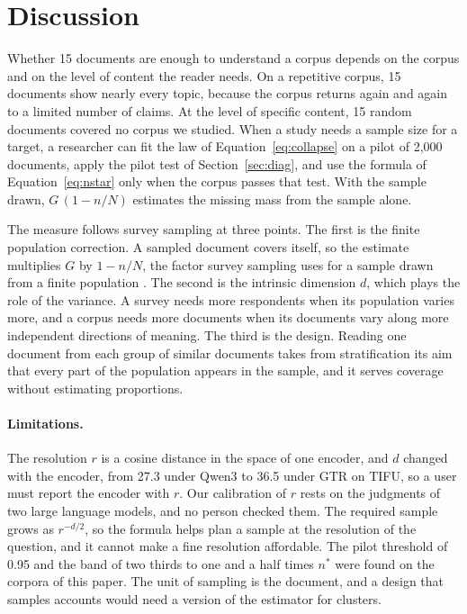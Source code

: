 \section{Discussion}

Whether 15 documents are enough to understand a corpus depends on the corpus and on the level of content the reader needs. On a repetitive corpus, 15 documents show nearly every topic, because the corpus returns again and again to a limited number of claims. At the level of specific content, 15 random documents covered no corpus we studied. When a study needs a sample size for a target, a researcher can fit the law of Equation~\ref{eq:collapse} on a pilot of 2{,}000 documents, apply the pilot test of Section~\ref{sec:diag}, and use the formula of Equation~\ref{eq:nstar} only when the corpus passes that test. With the sample drawn, $G\,(1 - n/N)$ estimates the missing mass from the sample alone.

The measure follows survey sampling at three points. The first is the finite population correction. A sampled document covers itself, so the estimate multiplies $G$ by $1 - n/N$, the factor survey sampling uses for a sample drawn from a finite population \citep{cochran1977}. The second is the intrinsic dimension $d$, which plays the role of the variance. A survey needs more respondents when its population varies more, and a corpus needs more documents when its documents vary along more independent directions of meaning. The third is the design. Reading one document from each group of similar documents takes from stratification \citep{kish1965} its aim that every part of the population appears in the sample, and it serves coverage without estimating proportions.

\paragraph{Limitations.} The resolution $r$ is a cosine distance in the space of one encoder, and $d$ changed with the encoder, from 27.3 under Qwen3 to 36.5 under GTR on TIFU, so a user must report the encoder with $r$. Our calibration of $r$ rests on the judgments of two large language models, and no person checked them. The required sample grows as $r^{-d/2}$, so the formula helps plan a sample at the resolution of the question, and it cannot make a fine resolution affordable. The pilot threshold of 0.95 and the band of two thirds to one and a half times $n^{*}$ were found on the corpora of this paper. The unit of sampling is the document, and a design that samples accounts would need a version of the estimator for clusters.
